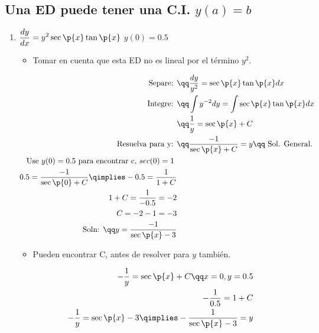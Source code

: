 \subsection{Una ED puede tener una C.I. $y(a)=b$}
\begin{enumerate}
    \item $\displaystyle \frac{d y}{d x} = y^2\sec\p{ x } \tan\p{ x } $ $y(0)=0.5$
        \begin{itemize}
            \item Tomar en cuenta que esta ED no es lineal por el término $y^2$.
        \end{itemize}
        \begin{center}
           \begin{align*}
               \text{ Separe:  } &\qq \frac{d y}{y^2} = \sec\p{ x } \tan\p{ x } dx \\ 
               \text{ Integre: } &\qq \int y^{-2} dy = \int \sec\p{ x } \tan\p{ x } dx  \\ 
               &\qq \frac{1}{y}= \sec\p{ x } + C \\ 
               \text{ Resuelva para y: } &\qq \frac{-1}{\sec\p{ x } +C} = y \qq \text{ Sol. General. } \\ 
               \text{ Use $y(0)=0.5$ para encontrar c, $sec(0)=1$   } \\ 
               0.5=\frac{-1}{\sec\p{ 0 } +C} \qimplies -0.5 = \frac{1}{1+C}  \\ 
               1+C = \frac{1}{-0.5}=-2 \\ 
               C = -2-1 = -3 \\ 
               \text{ Soln: } \qq y = \frac{-1}{\sec\p{ x } -3} \\ 
           \end{align*}
           \begin{itemize}
               \item Pueden encontrar C, antes de resolver para $y$ también.
           \end{itemize}
           \begin{align*}
               -\frac{1}{y}= \sec\p{ x } + C \qq x=0, y =0.5 \\ 
            -\frac{1}{0.5} = 1+C \\ 
            -\frac{1}{y}= \sec\p{ x } -3 \qimplies -\frac{1}{\sec\p{ x } -3} = y \\             
           \end{align*}
        \end{center}
    

\end{enumerate}
